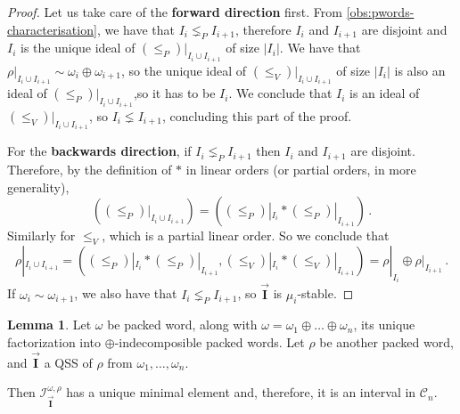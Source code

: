 \documentclass[12pt, reqno]{amsart}
\theoremstyle{definition}
\newtheorem{lm}[thm]{Lemma}
\newcommand{\III}{\vec{\mathbf{I}}}
\begin{document}
\begin{proof}
Let us take care of the \textbf{forward direction} first.
From \cref{obs:pwords-characterisation}, we have that $I_i \lneq_P I_{i+1}$, therefore $I_i$ and $I_{i+1}$ are disjoint and $I_i$ is the unique ideal of $(\leq_P)|_{I_i \cup I_{i+1}}$ of size $|I_i|$.
We have that $\rho|_{I_i \cup I_{i+1}} \sim \omega_i \oplus \omega_{i+1}$, so the unique ideal of $(\leq_V)|_{I_i \cup I_{i+1}}$ of size $|I_i|$ is also an ideal of $(\leq_P)|_{I_i \cup I_{i+1}}$,so it has to be $I_i$.
We conclude that $I_i$ is an ideal of $(\leq_V)|_{I_i \cup I_{i+1}}$, so $I_i \lneq I_{i+1}$, concluding this part of the proof.

For the \textbf{backwards direction}, if $I_i \lneq_P I_{i+1}$ then $I_i$ and $I_{i+1}$ are disjoint.
Therefore, by the definition of $\ast $ in linear orders (or partial orders, in more generality), 
$$((\leq_P)|_{I_i \cup I_{i+1}}) = ((\leq_P)|_{I_i} \ast (\leq_P)|_{I_{i+1}})\, . $$
Similarly for $\leq_V$, which is a partial linear order.
So we conclude that 
$$\rho|_{I_i \cup I_{i+1}} = ((\leq_P)|_{I_i} \ast (\leq_P)|_{I_{i+1}}, (\leq_V)|_{I_i} \ast (\leq_V)|_{I_{i+1}}) = \rho|_{I_i} \oplus \rho|_{I_{i+1}}\, .  $$
If $\omega_i \sim \omega_{i+1}$, we also have that $I_i \lneq_P I_{i+1}$, so $\III$ is $\mu_i$-stable.
\end{proof}

\begin{lm}\label{lm:minpacked}
Let $\omega$ be  packed word, along with $\omega = \omega_1 \oplus \dots \oplus \omega_n$, its unique factorization into $\oplus$-indecomposible packed words.
Let $\rho$ be another packed word, and $\III$ a QSS of $\rho$ from $\omega_1, \dots , \omega_n$.

Then $\mathcal I^{\omega, \rho}_{\III}$ has a unique minimal element and, therefore, it is an interval in $\mathcal C_n$.
\end{lm}
\end{document}
